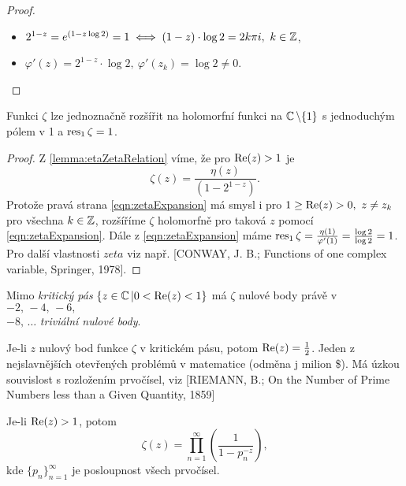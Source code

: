 \begin{proof}\mbox{}
\begin{itemize}
    \item $2^{1-z}=e^{(1-z\log 2)}=1\iff(1-z)\cdot\log2=2k\pi i,\ k\in \operatorname{\mathbb{Z}}$,
    \item $\varphi'(z)=2^{1-z}\cdot\log2,\ \varphi'(z_k)=\log2\neq0$.
\end{itemize}
\end{proof}

\begin{lemma}
Funkci $\zeta$ lze jednoznačně rozšířit na holomorfní funkci na $\operatorname{\mathbb{C}}\setminus\{1\}$ s jednoduchým pólem v 1 a $\operatorname{res}_1\zeta=1$.
\end{lemma}

\begin{proof}
Z \cref{lemma:etaZetaRelation} víme, že pro $\operatorname{Re}(z)>1$ je 
\begin{equation}\tag{*}\label{eqn:zetaExpansion}
    \zeta(z)=\frac{\eta(z)}{\left(1-2^{1-z}\right)}.
\end{equation}
Protože pravá strana \cref{eqn:zetaExpansion} má smysl i pro $1\geq\operatorname{Re}(z)>0,\ z\neq z_k$ pro všechna $k\in\operatorname{\mathbb{Z}}$, rozšíříme $\zeta$ holomorfně pro taková $z$ pomocí \cref{eqn:zetaExpansion}. Dále z \cref{eqn:zetaExpansion} máme $\operatorname{res}_1\zeta=\frac{\eta(1)}{\varphi'(1)}=\frac{\log2}{\log2}=1$.
Pro další vlastnosti $zeta$ viz např. [CONWAY, J. B.; Functions of one complex variable, Springer, 1978].
\end{proof}

\begin{lemma}
Mimo \emph{kritický pás} $\{z\in\operatorname{\mathbb{C}}|0<\operatorname{Re}(z)<1\}$ má $\zeta$ 
nulové body právě v $-2,\,-4,\,-6,\,$\\$-8,\,\ldots$ \emph{triviální nulové body}.
\end{lemma}
 Je-li $z$ nulový bod funkce $\zeta$ v kritickém pásu, potom $\operatorname{Re}(z)=\frac{1}{2}$. Jeden z nejslavnějších otevřených problémů v matematice (odměna j milion \$). Má úzkou souvislost s rozložením prvočísel, viz [RIEMANN, B.; On the Number of Prime Numbers less than a Given Quantity, 1859]

\begin{theorem} [Eulerova]\label{thm:EulerovaV}
Je-li $\operatorname{Re}(z)>1$, potom 
\begin{equation}\label{eqn:eulerovaV1}
    \zeta(z)=\prod_{n=1}^\infty\left(\frac{1}{1-p_n^{-z}}\right),
\end{equation}
kde $\{p_n\}_{n=1}^\infty$ je posloupnost všech prvočísel.
\end{theorem}

